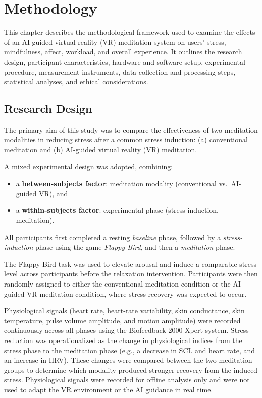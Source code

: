 \chapter{Methodology}

This chapter describes the methodological framework used to examine the effects of an AI-guided virtual-reality (VR) meditation system on users’ stress, mindfulness, affect, workload, and overall experience.  
It outlines the research design, participant characteristics, hardware and software setup, experimental procedure, measurement instruments, data collection and processing steps, statistical analyses, and ethical considerations.

\section{Research Design}
The primary aim of this study was to compare the effectiveness of two meditation modalities in reducing stress after a common stress induction: 
(a) conventional meditation and 
(b) AI-guided virtual reality (VR) meditation.

A mixed experimental design was adopted, combining:
\begin{itemize}
    \item a \textbf{between-subjects factor}: meditation modality (conventional vs.\ AI-guided VR), and
    \item a \textbf{within-subjects factor}: experimental phase (stress induction, meditation).
\end{itemize}

All participants first completed a resting \emph{baseline} phase, followed by a \emph{stress-induction} phase using the game \emph{Flappy Bird}, and then a \emph{meditation} phase. 

The Flappy Bird task was used to elevate arousal and induce a comparable stress level across participants before the relaxation intervention. Participants were then randomly assigned to either the conventional meditation condition or the AI-guided VR meditation condition, where stress recovery was expected to occur.

Physiological signals (heart rate, heart-rate variability, skin conductance, skin temperature, pulse volume amplitude, and motion amplitude) were recorded continuously across all phases using the Biofeedback 2000 Xpert system. Stress reduction was operationalized as the change in physiological indices from the stress phase to the meditation phase (e.g., a decrease in SCL and heart rate, and an increase in HRV). These changes were compared between the two meditation groups to determine which modality produced stronger recovery from the induced stress. Physiological signals were recorded for offline analysis only and were not used to adapt the VR environment or the AI guidance in real time.


